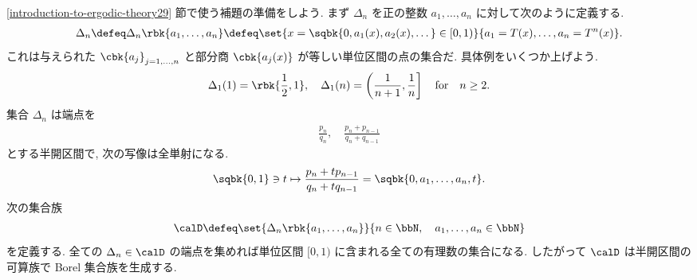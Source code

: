 \documentclass[openany, a4paper, oneside]{jsbook}
\begin{document}
\ref{introduction-to-ergodic-theory29} 節で使う補題の準備をしよう.
まず $\Delta_n$ を正の整数 $a_1,\dots,a_n$ に対して次のように定義する.
\begin{align}
 \Delta_n
 \defeq
 \Delta_n \rbk{a_1, \dots, a_n}
 \defeq
 \set{x = \sqbk{0, a_1(x), a_2(x), \dots} \in [0, 1)}{a_1 = T(x), \dots, a_n = T^n (x)}.
\end{align}
これは与えられた $\cbk{a_j}_{j=1, \dots, n}$ と部分商 $\cbk{a_j(x)}$ が等しい単位区間の点の集合だ.
具体例をいくつか上げよう.
\begin{align}
 \Delta_1(1)
 =
 \rbk{\frac{1}{2}, 1}, \quad
 \Delta_1(n)
 =
 \left(\frac{1}{n+1}, \frac{1}{n} \right] \quad \text{for} \quad n \geq 2.
\end{align}
集合 $\Delta_n$ は端点を
\begin{align}
 \frac{p_n}{q_n}, \quad
 \frac{p_n + p_{n-1}}{q_n + q_{n-1}}
\end{align}
とする半開区間で, 次の写像は全単射になる.
\begin{align}
 \sqbk{0, 1} \ni t
 \mapsto
 \frac{p_n + t p_{n-1}}{q_n + t q_{n-1}}
 =
 \sqbk{0, a_1, \dots, a_n, t}.
\end{align}
次の集合族
\begin{align}
 \calD
 \defeq
 \set{\Delta_n \rbk{a_1, \dots, a_n}}{n \in \bbN, \quad a_1, \dots, a_n \in \bbN} \label{introduction-to-ergodic-theory34}
\end{align}
を定義する.
全ての $\Delta_n \in \calD$ の端点を集めれば単位区間 $[0, 1)$ に含まれる全ての有理数の集合になる.
したがって $\calD$ は半開区間の可算族で Borel 集合族を生成する.
\end{document}
